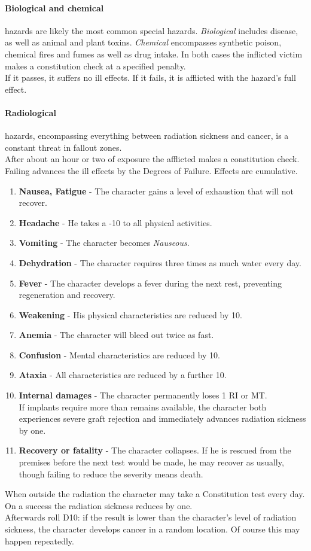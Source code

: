 \documentclass[11pt,a4paper,openany,dvipsnames]{book}
\begin{document}
	\paragraph{Biological and chemical} hazards are likely the most common special hazards. \emph{Biological} includes disease, as well as animal and plant toxins. \emph{Chemical} encompasses synthetic poison, chemical fires and fumes as well as drug intake. In both cases the inflicted victim makes a constitution check at a specified penalty.\\
	If it passes, it suffers no ill effects. If it fails, it is afflicted with the hazard’s full effect.
	\paragraph{Radiological} hazards, encompassing everything between radiation sickness and cancer, is a constant threat in fallout zones.\\
	After about an hour or two of exposure the afflicted makes a constitution check. Failing advances the ill effects by the Degrees of Failure.
	Effects are cumulative.
	\begin{enumerate}
		\setlength\itemsep{-10mm}
		\item \textbf{Nausea, Fatigue} - The character gains a level of exhaustion that will not recover.
		\item \textbf{Headache} - He takes a -10 to all physical activities.
		\item \textbf{Vomiting} - The character becomes \emph{Nauseous}.
		\item \textbf{Dehydration} - The character requires three times as much water every day.
		\item \textbf{Fever} - The character develops a fever during the next rest, preventing regeneration and recovery.
		\item \textbf{Weakening} - His physical characteristics are reduced by 10.
		\item \textbf{Anemia} - The character will bleed out twice as fast.
		\item \textbf{Confusion} - Mental characteristics are reduced by 10.
		\item \textbf{Ataxia} - All characteristics are reduced by a further 10.
		\item \textbf{Internal damages} - The character permanently loses 1 RI or MT.
			\\%
			If implants require more than remains available,
			the character both experiences severe graft rejection and immediately advances radiation sickness by one.
		\item \textbf{Recovery or fatality} - The character collapses. If he is rescued from the premises before the next test would be made, he may recover as usually, though failing to reduce the severity means death.
	\end{enumerate}
	\par
	When outside the radiation the character may take a Constitution test every day. On a success the radiation sickness reduces by one.\\
	Afterwards roll D10: if the result is lower than the character's level of radiation sickness, the character develops cancer in a random location.
	Of course this may happen repeatedly.
\end{document}

